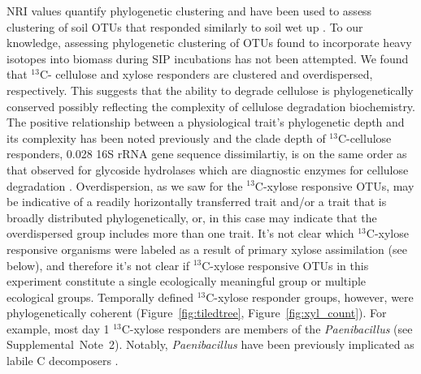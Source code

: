 NRI values quantify phylogenetic clustering \citep{Webb2000} and have 
been used to assess clustering of soil OTUs that responded similarly to soil
wet up \citep{Evans2014a,Placella2012}. To our knowledge, assessing
phylogenetic clustering of OTUs found to incorporate heavy isotopes into
biomass during SIP incubations has not been attempted. We found that $^{13}$C-
cellulose and xylose responders are clustered and overdispersed, respectively.
This suggests that the ability to degrade cellulose is phylogenetically
conserved possibly reflecting the complexity of cellulose degradation
biochemistry. The positive relationship between a physiological trait's
phylogenetic depth and its complexity has been noted previously
\citep{Martiny2013a} and the clade depth of $^{13}$C-cellulose responders,
0.028 16S rRNA gene sequence dissimilartiy, is on the same order as that
observed for glycoside hydrolases which are diagnostic enzymes for cellulose
degradation \citep{Berlemont2013}. Overdispersion, as we saw for the
$^{13}$C-xylose responsive OTUs, may be indicative of a readily horizontally
transferred trait and/or a trait that is broadly distributed phylogenetically,
or, in this case may indicate that the overdispersed group includes more than
one trait. It's not clear which $^{13}$C-xylose responsive organisms were
labeled as a result of primary xylose assimilation (see below), and therefore
it's not clear if $^{13}$C-xylose responsive OTUs in this experiment constitute
a single ecologically meaningful group or multiple ecological groups.
Temporally defined $^{13}$C-xylose responder groups, however, were
phylogenetically coherent (Figure~\ref{fig:tiledtree},
Figure~\ref{fig:xyl_count}). For example, most day
1 $^{13}$C-xylose responders are members of the \textit{Paenibacillus} (see
Supplemental~Note~2). Notably, \textit{Paenibacillus} have been previously
implicated as labile C decomposers \citep{Verastegui_2014}.

